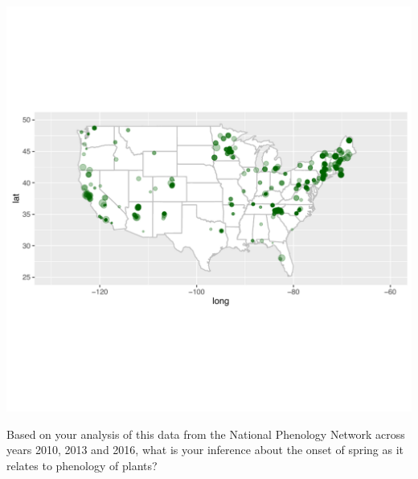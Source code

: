 \documentclass[11pt,twosided]{article}
\begin{document}
\begin{center}
\includegraphics[width=6.5in]{pheno2016}
\end{center}

Based on your analysis of this data from the National Phenology Network across years 2010, 2013 and 2016, what is your inference about the onset of spring as it relates to phenology of plants?  
\end{document}
